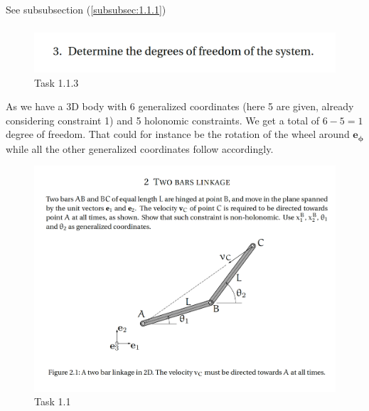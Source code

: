 \subsubsection{}
See subsubsection (\ref{subsubsec:1.1.1})
\subsubsection{}

\begin{figure}[ht]
    \centering
    \includegraphics[scale=0.4]{images/1.1.3.png}
    \caption{Task 1.1.3}
    \label{fig:task1.1.3}
\end{figure}

\noindent As we have a 3D body with 6 generalized coordinates (here 5 are given, already considering constraint 1) and 5 holonomic constraints. We get a total of $6 - 5 = 1$ degree of freedom. That could for instance be the rotation of the wheel around $\boldsymbol{e_\phi}$ while all the other generalized coordinates follow accordingly.

\clearpage

\begin{figure}[ht]
    \centering
    \includegraphics[scale=0.4]{images/1.2.png}
    \caption{Task 1.1}
    \label{fig:task1.2}
\end{figure}
\subsection{}\label{subsec:1.2}

